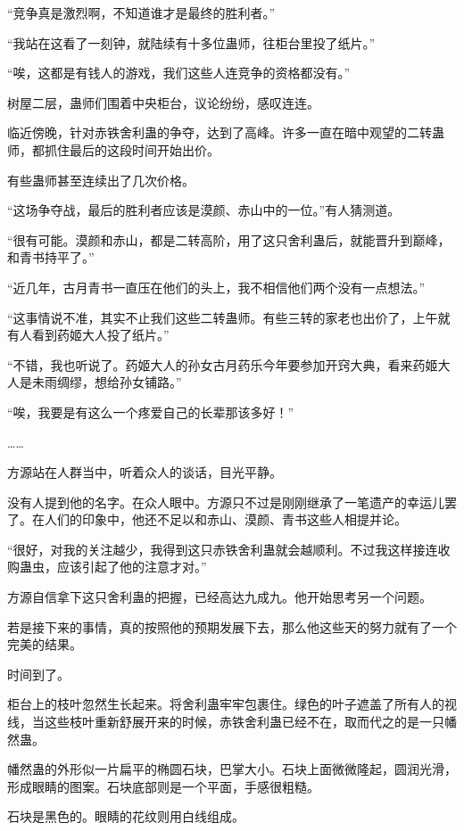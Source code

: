 
\begin{this_body}

“竞争真是激烈啊，不知道谁才是最终的胜利者。”

“我站在这看了一刻钟，就陆续有十多位蛊师，往柜台里投了纸片。”

“唉，这都是有钱人的游戏，我们这些人连竞争的资格都没有。”

树屋二层，蛊师们围着中央柜台，议论纷纷，感叹连连。

临近傍晚，针对赤铁舍利蛊的争夺，达到了高峰。许多一直在暗中观望的二转蛊师，都抓住最后的这段时间开始出价。

有些蛊师甚至连续出了几次价格。

“这场争夺战，最后的胜利者应该是漠颜、赤山中的一位。”有人猜测道。

“很有可能。漠颜和赤山，都是二转高阶，用了这只舍利蛊后，就能晋升到巅峰，和青书持平了。”

“近几年，古月青书一直压在他们的头上，我不相信他们两个没有一点想法。”

“这事情说不准，其实不止我们这些二转蛊师。有些三转的家老也出价了，上午就有人看到药姬大人投了纸片。”

“不错，我也听说了。药姬大人的孙女古月药乐今年要参加开窍大典，看来药姬大人是未雨绸缪，想给孙女铺路。”

“唉，我要是有这么一个疼爱自己的长辈那该多好！”

……

方源站在人群当中，听着众人的谈话，目光平静。

没有人提到他的名字。在众人眼中。方源只不过是刚刚继承了一笔遗产的幸运儿罢了。在人们的印象中，他还不足以和赤山、漠颜、青书这些人相提并论。

“很好，对我的关注越少，我得到这只赤铁舍利蛊就会越顺利。不过我这样接连收购蛊虫，应该引起了他的注意才对。”

方源自信拿下这只舍利蛊的把握，已经高达九成九。他开始思考另一个问题。

若是接下来的事情，真的按照他的预期发展下去，那么他这些天的努力就有了一个完美的结果。

时间到了。

柜台上的枝叶忽然生长起来。将舍利蛊牢牢包裹住。绿色的叶子遮盖了所有人的视线，当这些枝叶重新舒展开来的时候，赤铁舍利蛊已经不在，取而代之的是一只幡然蛊。

幡然蛊的外形似一片扁平的椭圆石块，巴掌大小。石块上面微微隆起，圆润光滑，形成眼睛的图案。石块底部则是一个平面，手感很粗糙。

石块是黑色的。眼睛的花纹则用白线组成。


\end{this_body}
